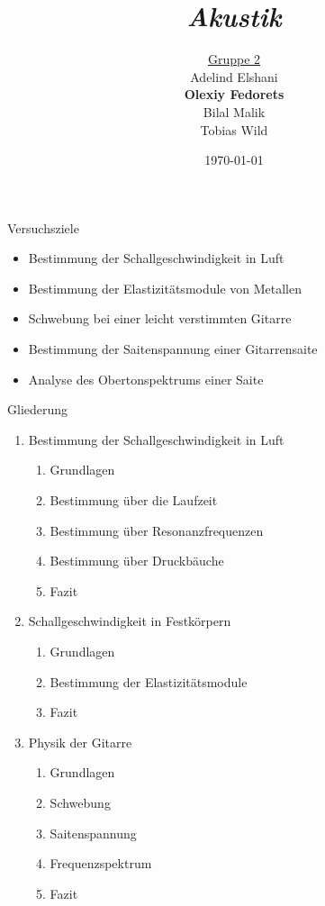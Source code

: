 \documentclass[12pt]{beamer}
\title{\emph{Akustik}}
\author{\underline{Gruppe 2}  \\  Adelind Elshani \\ \textbf{Olexiy Fedorets} \\ Bilal Malik \\ Tobias Wild}
\date{\today}
\begin{document}
	
\begin{frame}[plain]
\titlepage
\end{frame}

\begin{frame}{Versuchsziele}
\begin{itemize}
\item Bestimmung der Schallgeschwindigkeit in Luft
\item Bestimmung der Elastizitätsmodule von Metallen
\item Schwebung bei einer leicht verstimmten Gitarre 
\item Bestimmung der Saitenspannung einer Gitarrensaite 
\item Analyse des Obertonspektrums einer Saite
\end{itemize}
\end{frame}

\begin{frame}{Gliederung}
\begin{enumerate}
\item {Bestimmung der Schallgeschwindigkeit in Luft}
	\begin{enumerate}
	\item {Grundlagen}
	\item {Bestimmung über die Laufzeit}
	\item {Bestimmung über Resonanzfrequenzen}
	\item {Bestimmung über Druckbäuche}
	\item {Fazit}
	\end{enumerate}
\item {Schallgeschwindigkeit in Festkörpern}
	\begin{enumerate}
	\item {Grundlagen}
	\item {Bestimmung der Elastizitätsmodule}
	\item {Fazit}
	\end{enumerate}
\item {Physik der Gitarre}
	\begin{enumerate}
	\item {Grundlagen}
	\item {Schwebung}
	\item {Saitenspannung}
	\item {Frequenzspektrum}
	\item {Fazit}
	\end{enumerate}
\end{enumerate}
\end{frame}
\end{document}
